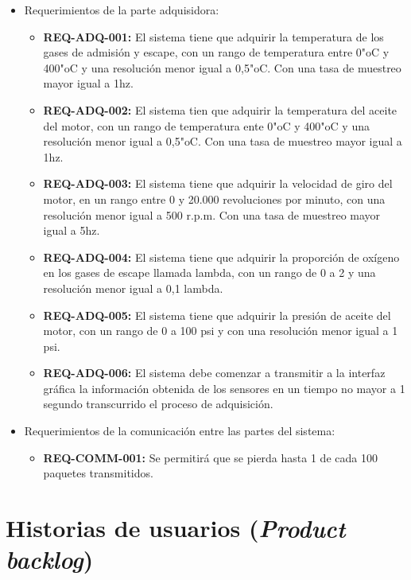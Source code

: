 \documentclass[11pt]{charter}
\begin{document}
\begin{itemize}
\begin{itemize}
	\end{itemize}
\item Requerimientos de la parte adquisidora:
	\begin{itemize}
	\item \textbf{REQ-ADQ-001:} El sistema tiene que adquirir la temperatura de los gases de admisión y escape, con un rango de temperatura entre 0"oC y 400"oC y una resolución menor igual a 0,5"oC. Con una tasa de muestreo mayor igual a 1hz.
	\item \textbf{REQ-ADQ-002:} El sistema tien que adquirir la temperatura del aceite del motor, con un rango de temperatura ente 0"oC y 400"oC y una resolución menor igual a 0,5"oC. Con una tasa de muestreo mayor igual a 1hz.
	\item \textbf{REQ-ADQ-003:} El sistema tiene que adquirir la velocidad de giro del motor, en un rango entre 0 y 20.000 revoluciones por minuto, con una resolución menor igual a 500 r.p.m. Con una tasa de muestreo mayor igual a 5hz.
	\item \textbf{REQ-ADQ-004:} El sistema tiene que adquirir la proporción de oxígeno en los gases de escape llamada lambda, con un rango de 0 a 2 y una resolución menor igual a 0,1 lambda.
	\item \textbf{REQ-ADQ-005:} El sistema tiene que adquirir la presión de aceite del motor, con un rango de 0 a 100 psi y con una resolución menor igual a 1 psi.
	\item \textbf{REQ-ADQ-006:} El sistema debe comenzar a transmitir a la interfaz gráfica la información obtenida de los sensores en un tiempo no mayor a 1 segundo transcurrido el proceso de adquisición.
	
	\end{itemize}
\item Requerimientos de la comunicación entre las partes del sistema:
	\begin{itemize}
	\item \textbf{REQ-COMM-001:} Se permitirá que se pierda hasta 1 de cada 100 paquetes transmitidos.	
	\end{itemize}
\end{itemize}

\section{Historias de usuarios (\textit{Product backlog})}
\label{sec:backlog}
\end{document}

